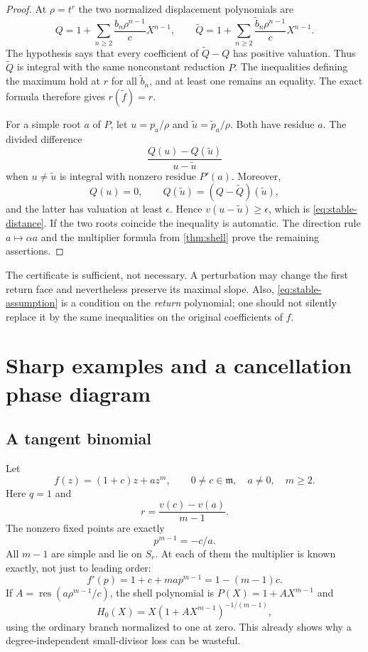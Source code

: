 \documentclass[11pt,letterpaper]{article}
\numberwithin{equation}{section}
\theoremstyle{plain}
\theoremstyle{definition}
\theoremstyle{remark}
\newcommand{\mm}{\mathfrak m}
\newcommand{\res}{\operatorname{res}}
\begin{document}
\begin{proof}
At $\rho=t^r$ the two normalized displacement polynomials are
\[
 Q=1+\sum_{n\ge2}\frac{b_n\rho^{n-1}}cX^{n-1},\qquad
 \widetilde Q=1+\sum_{n\ge2}
                \frac{\widetilde b_n\rho^{n-1}}cX^{n-1}.
\]
The hypothesis says that every coefficient of $\widetilde Q-Q$ has positive
valuation. Thus $\widetilde Q$ is integral with the same nonconstant
reduction $P$. The inequalities defining the maximum hold at $r$ for all
$\widetilde b_n$, and at least one remains an equality. The exact formula
therefore gives $r(\widetilde f)=r$.

For a simple root $a$ of $P$, let $u=p_a/\rho$ and
$\widetilde u=\widetilde p_a/\rho$. Both have residue $a$.
The divided difference
\[
 \frac{Q(u)-Q(\widetilde u)}{u-\widetilde u}
\]
when $u\ne\widetilde u$ is integral with nonzero residue $P'(a)$.
Moreover,
\[
 Q(u)=0,\qquad
 Q(\widetilde u)=(Q-\widetilde Q)(\widetilde u),
\]
and the latter has valuation at least $\epsilon$. Hence
$v(u-\widetilde u)\ge\epsilon$, which is \eqref{eq:stable-distance}.
If the two roots coincide the inequality is automatic. The direction rule
$a\mapsto\alpha a$ and the multiplier formula from \cref{thm:shell}
prove the remaining assertions.
\end{proof}

The certificate is sufficient, not necessary. A perturbation may change the
first return face and nevertheless preserve its maximal slope. Also,
\eqref{eq:stable-assumption} is a condition on the \emph{return} polynomial;
one should not silently replace it by the same inequalities on the original
coefficients of $f$.

\section{Sharp examples and a cancellation phase diagram}\label{sec:examples}

\subsection{A tangent binomial}

Let
\begin{equation}\label{eq:binomial}
 f(z)=(1+c)z+az^m,\qquad 0\ne c\in\mm,\quad a\ne0,\quad m\ge2.
\end{equation}
Here $q=1$ and
\[
 r=\frac{v(c)-v(a)}{m-1}.
\]
The nonzero fixed points are exactly
\[
 p^{m-1}=-c/a.
\]
All $m-1$ are simple and lie on $S_r$. At each of them the multiplier is
known exactly, not just to leading order:
\begin{equation}\label{eq:binomial-mult}
 f'(p)=1+c+ma p^{m-1}=1-(m-1)c.
\end{equation}
If $A=\res(a\rho^{m-1}/c)$, the shell polynomial is
$P(X)=1+AX^{m-1}$ and
\[
 H_0(X)=X(1+AX^{m-1})^{-1/(m-1)},
\]
using the ordinary branch normalized to one at zero. This already shows why
a degree-independent small-divisor loss can be wasteful.
\end{document}
